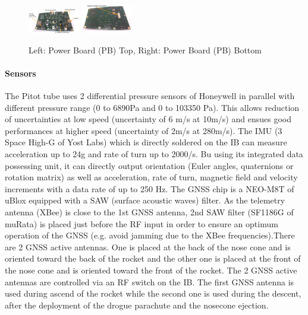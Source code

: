  \begin{figure}[h!]
 	\centering
        \includegraphics[width=0.20\textwidth]{img/AV_FIG_PB_top.PNG}
          \includegraphics[width=0.20\textwidth]{img/AV_FIG_PB_bottom.PNG}
        \caption{Left: Power Board (PB) Top, Right: Power Board (PB) Bottom}
        \label{f:avionics_pb}
 \end{figure}

\paragraph{Sensors}
The Pitot tube uses 2 differential pressure sensors of Honeywell in parallel with different pressure range (0 to 6890Pa and 0 to 103350 Pa). This allows reduction of uncertainties at low speed (uncertainty of 6 m/s at 10m/s) and ensues good performances at higher speed (uncertainty of 2m/s at 280m/s). The IMU (3 Space High-G of Yost Labs) which is directly soldered on the IB can measure acceleration up to 24g and rate of turn up to 2000/s. Bu using its integrated data possessing unit, it can directly output orientation (Euler angles, quaternions or rotation matrix) as well as acceleration, rate of turn, magnetic field and velocity increments with a data rate of up to 250 Hz.
The GNSS chip is a NEO-M8T of uBlox equipped with a SAW (surface acoustic waves) filter. As the telemetry antenna (XBee) is close to the 1st GNSS antenna, 2nd SAW filter (SF1186G of muRata) is placed just before the RF input in order to ensure an optimum operation of the GNSS (e.g. avoid jamming due to the XBee frequencies).There are 2 GNSS active antennas. One is placed at the back of the nose cone and is oriented toward the back of the rocket and the other one is placed at the front of the nose cone and is oriented toward the front of the rocket. The 2 GNSS active antennas are controlled via an RF switch on the IB. The first GNSS antenna is used during ascend of the rocket while the second one is used during the descent, after the deployment of the drogue parachute and the nosecone ejection.


